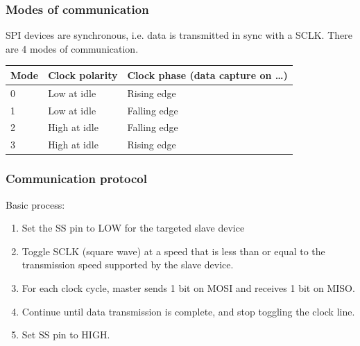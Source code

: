 \documentclass[11pt]{article}
\begin{document}
\subsubsection{Modes of communication}
\label{sec:orgc5653eb}
SPI devices are synchronous, i.e. data is transmitted in sync with a SCLK. There are 4 modes of communication.

\begin{center}
\begin{tabular}{m{2.5em}|m{10em}|m{15em}}
Mode & Clock polarity & Clock phase (data capture on \ldots{})\\[0pt]
\hline
0 & Low at idle & Rising edge\\[0pt]
1 & Low at idle & Falling edge\\[0pt]
2 & High at idle & Falling edge\\[0pt]
3 & High at idle & Rising edge\\[0pt]
\end{tabular}
\end{center}

 \newpage

\subsubsection{Communication protocol}
\label{sec:org5f3693c}
Basic process:
\begin{enumerate}
\item Set the SS pin to LOW for the targeted slave device
\item Toggle SCLK (square wave) at a speed that is less than or equal to the transmission speed supported by the slave device.
\item For each clock cycle, master sends 1 bit on MOSI and receives 1 bit on MISO.
\item Continue until data transmission is complete, and stop toggling the clock line.
\item Set SS pin to HIGH.
\end{enumerate}
\end{document}
